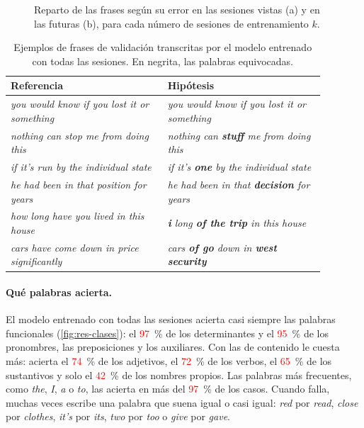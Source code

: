 \begin{figure}[htbp]
  \centering
  \caption{Reparto de las frases según su error en las sesiones vistas (a) y en las futuras (b), para cada número de sesiones de entrenamiento $k$.}
  \label{fig:res-calidad}
\end{figure}

\begin{table}[htbp]
  \centering
  \caption{Ejemplos de frases de validación transcritas por el modelo entrenado con todas las sesiones. En negrita, las palabras equivocadas.}
  \label{tab:res-ejemplos}
  \small
  \begin{tabular}{>{\raggedright\arraybackslash}p{0.44\linewidth}>{\raggedright\arraybackslash}p{0.44\linewidth}}
    \toprule
    \textbf{Referencia} & \textbf{Hipótesis} \\
    \midrule
    \textit{you would know if you lost it or something} & \textit{you would know if you lost it or something} \\
    \textit{nothing can stop me from doing this}        & \textit{nothing can \textbf{stuff} me from doing this} \\
    \textit{if it's run by the individual state}        & \textit{if it's \textbf{one} by the individual state} \\
    \textit{he had been in that position for years}     & \textit{he had been in that \textbf{decision} for years} \\
    \textit{how long have you lived in this house}      & \textit{\textbf{i} long \textbf{of the trip} in this house} \\
    \textit{cars have come down in price significantly} & \textit{cars \textbf{of go} down in \textbf{west security}} \\
    \bottomrule
  \end{tabular}
\end{table}

\paragraph{Qué palabras acierta.} El modelo entrenado con todas las sesiones acierta casi siempre las palabras funcionales (\cref{fig:res-clases}): el \textcolor{red}{97}~\% de los determinantes y el \textcolor{red}{95}~\% de los pronombres, las preposiciones y los auxiliares. Con las de contenido le cuesta más: acierta el \textcolor{red}{74}~\% de los adjetivos, el \textcolor{red}{72}~\% de los verbos, el \textcolor{red}{65}~\% de los sustantivos y solo el \textcolor{red}{42}~\% de los nombres propios. Las palabras más frecuentes, como \textit{the}, \textit{I}, \textit{a} o \textit{to}, las acierta en más del \textcolor{red}{97}~\% de los casos. Cuando falla, muchas veces escribe una palabra que suena igual o casi igual: \textit{red} por \textit{read}, \textit{close} por \textit{clothes}, \textit{it's} por \textit{its}, \textit{two} por \textit{too} o \textit{give} por \textit{gave}.

